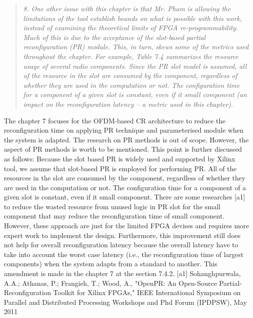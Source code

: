 \documentclass{article}
\begin{document}
\begin{quote}
\emph{8. One other issue with this chapter is that Mr. Pham is allowing the limitations of the tool establish bounds on what is possible with this work, instead of examining the theoretical limits of FPGA re-programmability. Much of this is due to the acceptance of the slot-based partial reconfiguration (PR) module. This, in turn, skews some of the metrics used throughout the chapter. For example, Table 7.4 summarizes the resource usage of several radio components. Since the PR slot model is assumed, all of the resource in the slot are consumed by the component, regardless of whether they are used in the computation or not. The configuration time for a component of a given slot is constant, even if it small component (an impact on the reconfiguration latency – a metric used in this chapter).}
\end{quote}
The chapter 7 focuses for the OFDM-based CR architecture to reduce the reconfiguration time on applying PR technique and parameterised module when the system is adapted. The research on PR methods is out of scope. However, the aspect of PR methods is worth to be mentioned. This point is further discussed as follows:
Because the slot based PR is widely used and supported by Xilinx tool, we assume that slot-based PR is employed for performing PR.
All of the resources in the slot are consumed by the component, regardless of whether they are used in the computation or not. The configuration time for a component of a given slot is constant, even if it small component.
There are some researches [a1] to reduce the wasted resource from unused logic in PR slot for the small component that may reduce the reconfiguration time of small component. However, these approach are just for the limited FPGA devises and requires more expert work to implement the design.  
Furthermore, this improvement still does not help for overall reconfiguration latency because the overall latency have to take into account the worst case latency (i.e., the reconfiguration time of largest components) when the system adapts from a standard to another.
This amendment is made in the chapter 7 at the section 7.4.2.
[a1]  Sohanghpurwala, A.A.; Athanas, P.; Frangieh, T.; Wood, A., "OpenPR: An Open-Source Partial-Reconfiguration Toolkit for Xilinx FPGAs," IEEE International Symposium on Parallel and Distributed Processing Workshops and Phd Forum (IPDPSW), May 2011
\end{document}
